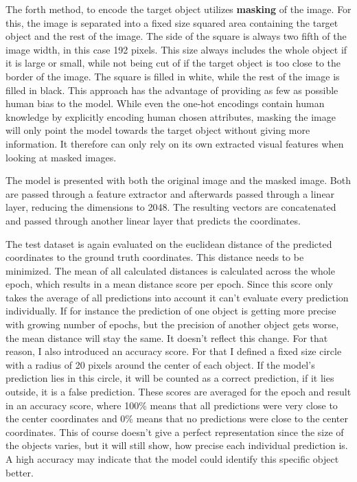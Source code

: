 The forth method, to encode the target object utilizes \textbf{masking} of the image.
For this, the image is separated into a fixed size squared area containing the target object and the rest of the image.
The side of the square is always two fifth of the image width, in this case 192 pixels.
This size always includes the whole object if it is large or small, while not being cut of if the target object is too close to the border of the image.
The square is filled in white, while the rest of the image is filled in black.
This approach has the advantage of providing as few as possible human bias to the model.
While even the one-hot encodings contain human knowledge by explicitly encoding human chosen attributes, masking the image will only point the model towards the target object without giving more information.
It therefore can only rely on its own extracted visual features when looking at masked images.

The model is presented with both the original image and the masked image.
Both are passed through a feature extractor and afterwards passed through a linear layer, reducing the dimensions to 2048.
The resulting vectors are concatenated and passed through another linear layer that predicts the coordinates.

The test dataset is again evaluated on the euclidean distance of the predicted coordinates to the ground truth coordinates.
This distance needs to be minimized.
The mean of all calculated distances is calculated across the whole epoch, which results in a mean distance score per epoch.
Since this score only takes the average of all predictions into account it can't evaluate every prediction individually.
If for instance the prediction of one object is getting more precise with growing number of epochs, but the precision of another object gets worse, the mean distance will stay the same.
It doesn't reflect this change.
For that reason, I also introduced an accuracy score.
For that I defined a fixed size circle with a radius of 20 pixels around the center of each object.
If the model's prediction lies in this circle, it will be counted as a correct prediction, if it lies outside, it is a false prediction.
These scores are averaged for the epoch and result in an accuracy score, where 100\% means that all predictions were very close to the center coordinates and 0\% means that no predictions were close to the center coordinates.
This of course doesn't give a perfect representation since the size of the objects varies, but it will still show, how precise each individual prediction is.
A high accuracy may indicate that the model could identify this specific object better.

